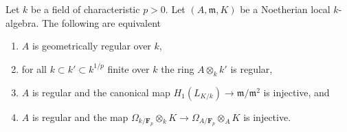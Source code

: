 %
\begin{proposition}
\label{proposition-characterization-geometrically-regular}
Let $k$ be a field of characteristic $p > 0$.
Let $(A, \mathfrak m, K)$ be a Noetherian local
$k$-algebra. The following are equivalent
\begin{enumerate}
\item $A$ is geometrically regular over $k$,
\item for all $k \subset k' \subset k^{1/p}$
finite over $k$ the ring $A \otimes_k k'$ is regular,
\item $A$ is regular and the canonical map
$H_1(L_{K/k}) \to \mathfrak m/\mathfrak m^2$ is injective, and
\item $A$ is regular and the map
$\Omega_{k/\mathbf{F}_p} \otimes_k K \to \Omega_{A/\mathbf{F}_p} \otimes_A K$
is injective.
\end{enumerate}
\end{proposition}

